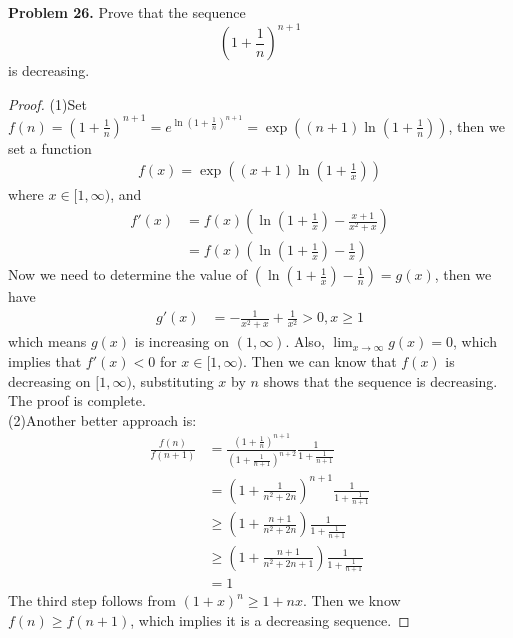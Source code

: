 \documentclass[12pt,leqno]{amsart}
\begin{document}
\noindent
{\bf Problem 26.}
Prove that the sequence
$$
\left(1+\frac{1}{n}\right)^{n+1}
$$
is decreasing.
\begin{proof}
(1)Set $f(n) = \left(1+\frac{1}{n}\right)^{n+1} = e^{\ln \left(1+\frac{1}{n}\right)^{n+1}} = \exp \left((n+1) \ln \left(1+\frac{1}{n}\right) \right)$, then we set a function 
\begin{align*}
    f(x) = \exp \left((x+1) \ln \left(1+\frac{1}{x}\right) \right)
\end{align*}
where $x\in [1,\infty)$, and 
\begin{align*}
    f'(x) & = f(x) \left(\ln \left(1+\frac{1}{x}\right) - \frac{x+1}{x^2+x} \right) \\
    & = f(x) \left(\ln \left(1+\frac{1}{x}\right) - \frac{1}{x} \right)
\end{align*}
Now we need to determine the value of $\left(\ln \left(1+\frac{1}{x}\right) - \frac{1}{n} \right) = g(x)$, then we have
\begin{align*}
    g'(x) & = -\frac{1}{x^2 + x} + \frac{1}{x^2} > 0, x \geq 1
\end{align*}
which means $g(x)$ is increasing on $(1,\infty)$. Also, $\lim_{x\rightarrow \infty} g(x) = 0$, which implies that $f'(x) < 0$ for $x \in [1, \infty)$. Then we can know that $f(x)$ is decreasing on $[1,\infty)$, substituting $x$ by $n$ shows that the sequence is decreasing. The proof is complete. \\
\hspace*{2em}(2)Another better approach is: 
\begin{align*}
    \frac{f(n)}{f(n+1)} & = \frac{\left(1 + \frac{1}{n}\right)^{n+1}}{\left(1 + \frac{1}{n+1}\right)^{n+2}} \frac{1}{1 + \frac{1}{n+1}} \\
    & = \left(1 + \frac{1}{n^2 + 2n} \right)^{n+1} \frac{1}{1 + \frac{1}{n+1}} \\
    & \geq \left(1 + \frac{n+1}{n^2 + 2n} \right) \frac{1}{1 + \frac{1}{n+1}} \\
    & \geq \left(1 + \frac{n+1}{n^2 + 2n + 1} \right) \frac{1}{1 + \frac{1}{n+1}} \\
    & = 1
\end{align*}
The third step follows from $(1+x)^n \geq 1 + nx$. Then we know $f(n)\geq f(n+1)$, which implies it is a decreasing sequence.
\end{proof}
\end{document}
